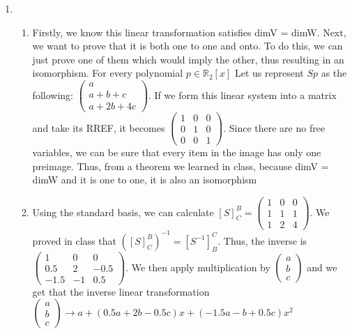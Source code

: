 \documentclass{article}
\begin{document}
\begin{enumerate}
\begin{enumerate}
\end{enumerate}

\item

\begin{enumerate}

\item Firstly, we know this linear transformation satisfies dimV = dimW. Next, we want to prove that it is both one to one and onto. To do this, we can just prove one of them which would imply the other, thus resulting in an isomorphism. For every polynomial $p \in \mathbb{R}_2[x]$ Let us represent $Sp$ as the following: $\left(\begin{array}{c} a \\ a + b + c \\ a + 2b + 4c \end{array}\right)$. If we form this linear system into a matrix and take its RREF, it becomes $\left(\begin{array}{ccc} 1 & 0 & 0 \\ 0 & 1 & 0 \\ 0 & 0 & 1 \end{array}\right)$. Since there are no free variables, we can be sure that every item in the image has only one preimage. Thus, from a theorem we learned in class, because dimV = dimW and it is one to one, it is also an isomorphism

\item Using the standard basis, we can calculate $[S]^B_C = \left(\begin{array}{ccc} 1 & 0 & 0 \\ 1 & 1 & 1 \\ 1 & 2 & 4 \end{array}\right)$. We proved in class that $([S]^B_C)^{-1} = [S^{-1}]^C_B$. Thus, the inverse is $\left(\begin{array}{ccc} 1 & 0 & 0 \\ 0.5 & 2 & -0.5 \\ -1.5 & -1 & 0.5 \end{array}\right)$. We then apply multiplication by $\left(\begin{array}{c} a \\ b \\ c \end{array}\right)$ and we get that the inverse linear transformation $\left(\begin{array}{c} a \\ b \\ c \end{array}\right) \rightarrow a + (0.5a + 2b -0.5c)x + (-1.5a -b + 0.5c)x^2$ 


\end{enumerate}
\end{enumerate}
\end{document}
